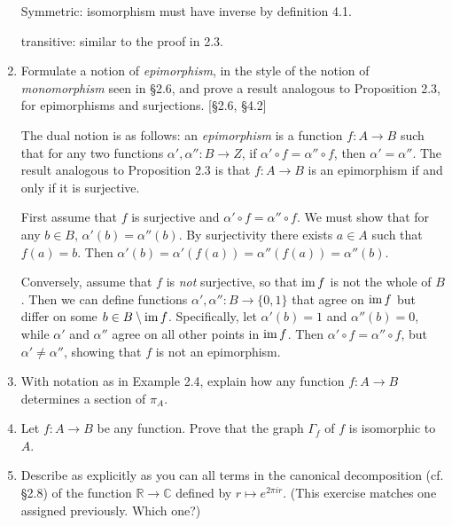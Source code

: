 \begin{enumerate}
\begin{solution}
            Symmetric: isomorphism must have inverse by definition 4.1.
     
            transitive: similar to the proof in 2.3. 
        \end{solution}
    \item Formulate a notion of \textit{epimorphism}, in the style of the notion of \textit{monomorphism} seen in \S2.6, and prove a result analogous to Proposition 2.3, for epimorphisms and surjections. [\S2.6, \S4.2]
        
          \begin{solution}
              The dual notion is as follows: an \textit{epimorphism} is a function $f: A \to B$ such that for any two functions $\alpha', \alpha'': B \to Z$, if $\alpha' \circ f = \alpha'' \circ f$, then $\alpha' = \alpha''$.
              The result analogous to Proposition 2.3 is that $f: A \to B$ is an epimorphism if and only if it is surjective.

              First assume that $f$ is surjective and $\alpha' \circ f = \alpha'' \circ f$. We must show that for any $b \in B$, $\alpha'(b) = \alpha''(b)$. By surjectivity there exists $a \in A$ such that $f(a) = b$. Then $\alpha'(b) = \alpha'(f(a)) = \alpha''(f(a)) = \alpha''(b)$.

              Conversely, assume that $f$ is \emph{not} surjective, so that $\operatorname{im} f$ is not the whole of $B$. Then we can define functions $\alpha',\alpha'': B \to \{0,1\}$ that agree on $\operatorname{im} f$ but differ on some $b \in B \setminus \operatorname{im} f$. Specifically, let $\alpha'(b) = 1$ and $\alpha''(b) = 0$, while $\alpha'$ and $\alpha''$ agree on all other points in $\operatorname{im} f$. Then $\alpha' \circ f = \alpha'' \circ f$, but $\alpha' \neq \alpha''$, showing that $f$ is not an epimorphism.
          \end{solution}

    \item With notation as in Example 2.4, explain how any function $f: A \to B$ determines a section of $\pi_A$.

    \item Let $f: A \to B$ be any function. Prove that the graph $\Gamma_f$ of $f$ is isomorphic to $A$.

    \item Describe as explicitly as you can all terms in the canonical decomposition (cf. \S2.8) of the function $\mathbb{R} \to \mathbb{C}$ defined by $r \mapsto e^{2\pi i r}$. (This exercise matches one assigned previously. Which one?)


\end{enumerate}
